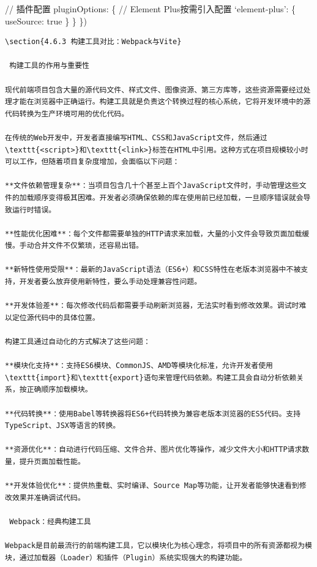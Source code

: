 {{// 插件配置 pluginOptions: \{ // Element Plus按需引入配置 `element-plus': \{ useSource: true \} \} \})

\begin{lstlisting}
\section{4.6.3 构建工具对比：Webpack与Vite}

 构建工具的作用与重要性

现代前端项目包含大量的源代码文件、样式文件、图像资源、第三方库等，这些资源需要经过处理才能在浏览器中正确运行。构建工具就是负责这个转换过程的核心系统，它将开发环境中的源代码转换为生产环境可用的优化代码。

在传统的Web开发中，开发者直接编写HTML、CSS和JavaScript文件，然后通过\texttt{<script>}和\texttt{<link>}标签在HTML中引用。这种方式在项目规模较小时可以工作，但随着项目复杂度增加，会面临以下问题：

**文件依赖管理复杂**：当项目包含几十个甚至上百个JavaScript文件时，手动管理这些文件的加载顺序变得极其困难。开发者必须确保依赖的库在使用前已经加载，一旦顺序错误就会导致运行时错误。

**性能优化困难**：每个文件都需要单独的HTTP请求来加载，大量的小文件会导致页面加载缓慢。手动合并文件不仅繁琐，还容易出错。

**新特性使用受限**：最新的JavaScript语法（ES6+）和CSS特性在老版本浏览器中不被支持，开发者要么放弃使用新特性，要么手动处理兼容性问题。

**开发体验差**：每次修改代码后都需要手动刷新浏览器，无法实时看到修改效果。调试时难以定位源代码中的具体位置。

构建工具通过自动化的方式解决了这些问题：

**模块化支持**：支持ES6模块、CommonJS、AMD等模块化标准，允许开发者使用\texttt{import}和\texttt{export}语句来管理代码依赖。构建工具会自动分析依赖关系，按正确顺序加载模块。

**代码转换**：使用Babel等转换器将ES6+代码转换为兼容老版本浏览器的ES5代码。支持TypeScript、JSX等语言的转换。

**资源优化**：自动进行代码压缩、文件合并、图片优化等操作，减少文件大小和HTTP请求数量，提升页面加载性能。

**开发体验优化**：提供热重载、实时编译、Source Map等功能，让开发者能够快速看到修改效果并准确调试代码。

 Webpack：经典构建工具

Webpack是目前最流行的前端构建工具，它以模块化为核心理念，将项目中的所有资源都视为模块，通过加载器（Loader）和插件（Plugin）系统实现强大的构建功能。


\end{lstlisting}}}
